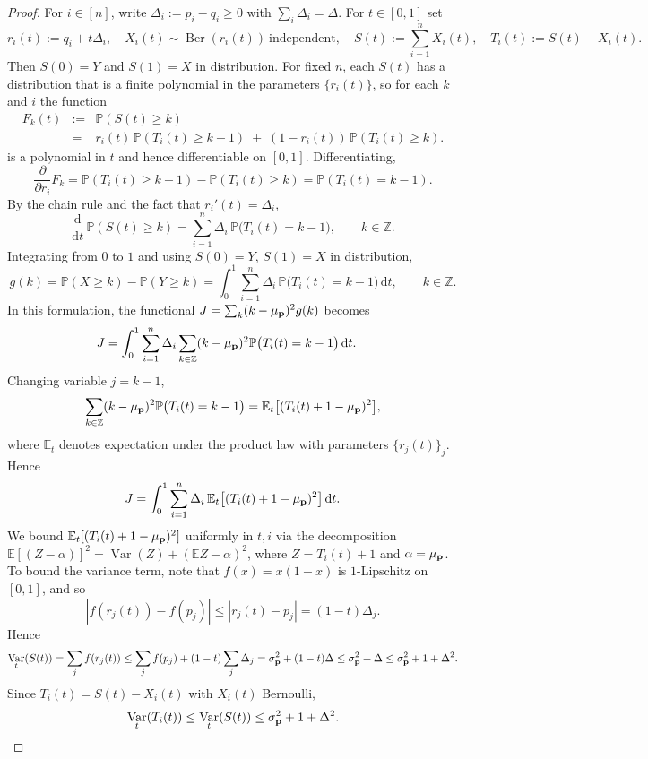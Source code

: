 \documentclass[10pt,a4paper]{amsart}
\DeclareMathOperator{\Ber}{Ber}
\newcommand{\E}{\mathbb{E}}
\renewcommand{\P}{\mathbb{P}}
\DeclareMathOperator{\Var}{Var}
\newcommand{\beq}{\begin{eqnarray*}}
\newcommand{\beqn}{\begin{eqnarray}}
\newcommand{\eeq}{\end{eqnarray*}}
\newcommand{\eeqn}{\end{eqnarray}}
\renewcommand{\vec}[1]{\textup{{\bf #1}}}
\begin{document}
\begin{proof}
For $i\in[n]$,
write $\Delta_i:=p_i-q_i\ge0$ with $\sum_i\Delta_i=\Delta$. For
$t\in[0,1]$ set
\[
  r_i(t) := q_i + t\Delta_i,\quad
  X_i(t)\sim\Ber(r_i(t))\ \text{independent},\quad
  S(t):=\sum_{i=1}^n X_i(t),\quad
  T_i(t):=S(t)-X_i(t).
\]
Then $S(0)=Y$ and $S(1)=X$ in distribution. For fixed $n$, each
$S(t)$ has a distribution that is a finite polynomial in the parameters
$\{r_i(t)\}$, so for each $k$ and $i$ the function
\beq
F_k(t) &:=&
\P(S(t)\ge k) \\
&=&
r_i(t)\,\P(T_i(t)\ge k-1)\;+\;(1-r_i(t))\,\P(T_i(t)\ge k)
.
\eeq
is a polynomial in $t$ and hence differentiable on $[0,1]$.
Differentiating,
\[
  \frac{\partial}{\partial r_i}F_k
  = \P(T_i(t)\ge k-1)-\P(T_i(t)\ge k)
  = \P(T_i(t)=k-1).
\]
By the chain rule and the fact that $r_i'(t)=\Delta_i$,
\[
  \frac{\mathrm{d}}{\mathrm{d}t}\,\P(S(t)\ge k)
  = \sum_{i=1}^n \Delta_i\,\P\bigl(T_i(t)=k-1\bigr),
  \qquad k\in\mathbb Z.
\]
Integrating from $0$ to $1$ and using $S(0)=Y$,
$S(1)=X$ in distribution,
\[
  g(k)
  = \P(X\ge k)-\P(Y\ge k)
  = \int_0^1 \sum_{i=1}^n \Delta_i\,\P\bigl(T_i(t)=k-1\bigr)\,\mathrm{d}t,
  \qquad k\in\mathbb Z.
\]
In this formulation, the functional $J=\sum_k (k-\mu_{\vec{p}})^2 g(k)$
becomes
\begin{align*}
  J
  &= \int_0^1 \sum_{i=1}^n \Delta_i
       \sum_{k\in\mathbb Z} (k-\mu_{\vec{p}})^2 \P\bigl(T_i(t)=k-1\bigr)\,\mathrm{d}t.
\end{align*}
Changing variable $j=k-1$,
\[
  \sum_{k\in\mathbb Z} (k-\mu_{\vec{p}})^2 \P\bigl(T_i(t)=k-1\bigr)
  = \E_t\bigl[(T_i(t)+1-\mu_{\vec{p}})^2\bigr],
\]
where $\E_t$ denotes expectation under the product law with
parameters $\{r_j(t)\}_j$.
Hence
\begin{equation}\label{eq:J-Et}
  J
  = \int_0^1 \sum_{i=1}^n \Delta_i\,
       \E_t\bigl[(T_i(t)+1-\mu_{\vec{p}})^2\bigr]\,\mathrm{d}t.
\end{equation}
We bound $\E_t[(T_i(t)+1-\mu_{\vec{p}})^2]$ uniformly in $t,i$
via the decomposition
$\E[(Z-\alpha)]^2=\Var(Z)+(\E Z-\alpha)^2$,
where $Z=T_i(t)+1$ and $\alpha=\mu_{\vec{p}}$.
To bound the variance term, note that
$f(x)=x(1-x)$
is $1$-Lipschitz on $[0,1]$, and so
\[
  |f(r_j(t))-f(p_j)| \le |r_j(t)-p_j| = (1-t)\Delta_j.
\]
Hence
\[
  \Var_t(S(t))
  = \sum_j f(r_j(t))
  \le \sum_j f(p_j) + (1-t)\sum_j\Delta_j
  = \sigma_{\vec{p}}^2 + (1-t)\Delta
  \le \sigma_{\vec{p}}^2 + \Delta
  \le\sigma_{\vec{p}}^2 + 1 + \Delta^2.
\]
Since $T_i(t)=S(t)-X_i(t)$ with $X_i(t)$ Bernoulli,
\beqn
\label{eq:VarTi-bound}
  \Var_t(T_i(t))
  \le \Var_t(S(t))
  \le \sigma_{\vec{p}}^2 + 1 + \Delta^2.
\eeqn


\end{proof}
\end{document}

